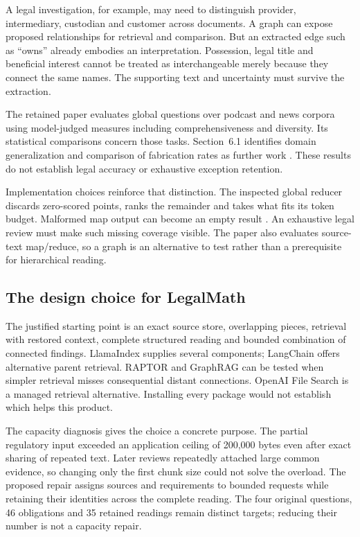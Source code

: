 A legal investigation, for example, may need to distinguish provider,
intermediary, custodian and customer across documents. A graph can expose
proposed relationships for retrieval and comparison. But an extracted edge
such as “owns” already embodies an interpretation. Possession, legal title
and beneficial interest cannot be treated as interchangeable merely because
they connect the same names. The supporting text and uncertainty must survive
the extraction.

The retained paper evaluates global questions over podcast and news corpora
using model-judged measures including comprehensiveness and diversity. Its
statistical comparisons concern those tasks. Section~6.1 identifies domain
generalization and comparison of fabrication rates as further work
\citep[secs.~4--6 and App.~G]{graphrag2025}. These results do not establish
legal accuracy or exhaustive exception retention.

Implementation choices reinforce that distinction. The inspected global
reducer discards zero-scored points, ranks the remainder and takes what fits
its token budget. Malformed map output can become an empty result
\citep{graphragcode2026}. An exhaustive legal review must make such missing
coverage visible. The paper also evaluates source-text map/reduce, so a graph
is an alternative to test rather than a prerequisite for hierarchical reading.

\subsection{The design choice for LegalMath}

The justified starting point is an exact source store, overlapping pieces,
retrieval with restored context, complete structured reading and bounded
combination of connected findings. LlamaIndex supplies several components;
LangChain offers alternative parent retrieval. RAPTOR and GraphRAG can be
tested when simpler retrieval misses consequential distant connections.
OpenAI File Search is a managed retrieval alternative. Installing every
package would not establish which helps this product.

The capacity diagnosis gives the choice a concrete purpose. The partial
regulatory input exceeded an application ceiling of 200,000 bytes even after
exact sharing of repeated text. Later reviews repeatedly attached large
common evidence, so changing only the first chunk size could not solve the
overload. The proposed repair assigns sources and requirements to bounded
requests while retaining their identities across the complete reading.
The four original questions, 46 obligations and 35 retained readings remain
distinct targets; reducing their number is not a capacity repair.

